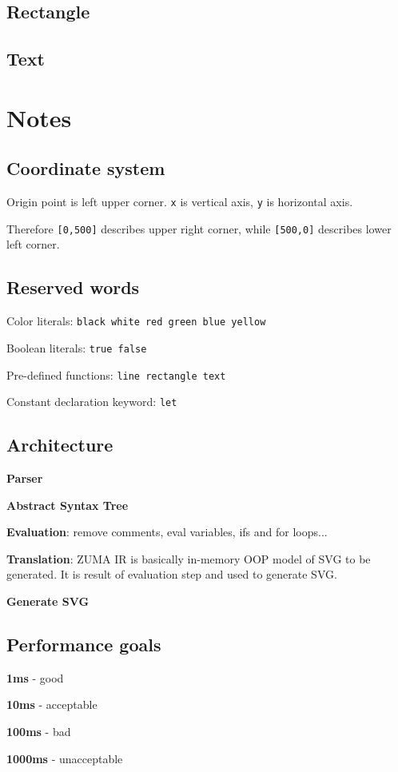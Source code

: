 \documentclass{scrreprt}
\begin{document}
\section{Rectangle}

\section{Text}


\chapter{Notes}

\section{Coordinate system}

Origin point is left upper corner. \texttt{x} is vertical axis, \texttt{y} is horizontal axis.

Therefore \texttt{[0,500]} describes upper right corner, while \texttt{[500,0]} describes lower left corner.


\section{Reserved words}

Color literals: \texttt{black white red green blue yellow}

Boolean literals: \texttt{true false}

Pre-defined functions: \texttt{line rectangle text}

Constant declaration keyword: \texttt{let}


\section{Architecture}

\textbf{Parser}

\textbf{Abstract Syntax Tree}

\textbf{Evaluation}: remove comments, eval variables, ifs and for loops...

\textbf{Translation}: ZUMA IR is basically in-memory OOP model of SVG to be generated. It is result of evaluation step and used to generate SVG.

\textbf{Generate SVG} 


\section{Performance goals}

\textbf{1ms} - good

\textbf{10ms} - acceptable

\textbf{100ms} - bad

\textbf{1000ms} - unacceptable
\end{document}
